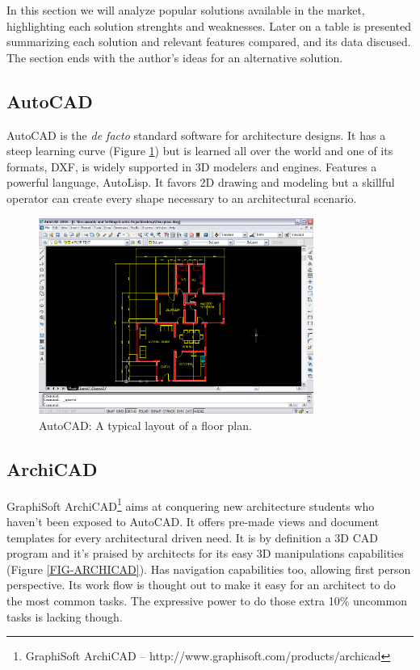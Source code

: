 
In this section we will analyze popular solutions available in the market,
highlighting each solution strenghts and weaknesses.
Later on a table is presented summarizing each solution and relevant features compared, and its
data discused.
The section ends with the author's ideas for an alternative solution.

\subsection{AutoCAD}
AutoCAD is the \emph{de facto} standard software for architecture designs.
It has a steep learning curve (Figure \ref{FIG-AUTOCAD}) but is learned all over the world and one of
its formats, DXF, is widely supported in 3D modelers and engines. Features
a powerful language, AutoLisp. It favors 2D drawing and modeling but a
skillful operator can create every shape necessary to an architectural scenario.

\begin{figure}[!ht]
    \centering
    \includegraphics[width=9cm]{gfx/autocad-1.png}
    \caption{AutoCAD: A typical layout of a floor plan.}
    \label{FIG-AUTOCAD}
\end{figure}

\subsection{ArchiCAD}
\nocite{SITE-ARCHICAD}
GraphiSoft ArchiCAD\footnote{GraphiSoft ArchiCAD -- http://www.graphisoft.com/products/archicad}
aims at conquering new architecture students who haven't been exposed to AutoCAD.
It offers pre-made views and document templates for every architectural driven need.
It is by definition a 3D CAD program and it's praised by architects for its easy 3D manipulations capabilities
(Figure \ref{FIG-ARCHICAD}). Has navigation capabilities too, allowing first person perspective.
Its work flow is thought out to make it easy for an architect to do the most common tasks.
The expressive power to do those extra 10\% uncommon tasks is lacking though.

